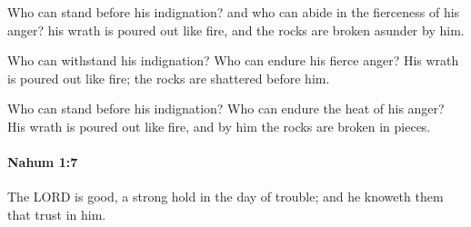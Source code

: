 			\begin{versebox}
					\item[BHS] 
					\item[LXX] 
					\item[ASV] Who can stand before his indignation? and who can abide in the fierceness of his anger? his wrath is poured out like fire, and the rocks are broken asunder by him.
					\item[NIV] Who can withstand his indignation? Who can endure his fierce anger? His wrath is poured out like fire; the rocks are shattered before him.
					\item[NRSV] Who can stand before his indignation? Who can endure the heat of his anger? His wrath is poured out like fire, and by him the rocks are broken in pieces.
			\end{versebox}

		\paragraph{Nahum 1:7} %
			\label{NAHUM-1-7}

			The LORD is good, a strong hold in the day of trouble; and he knoweth them that trust in him.

